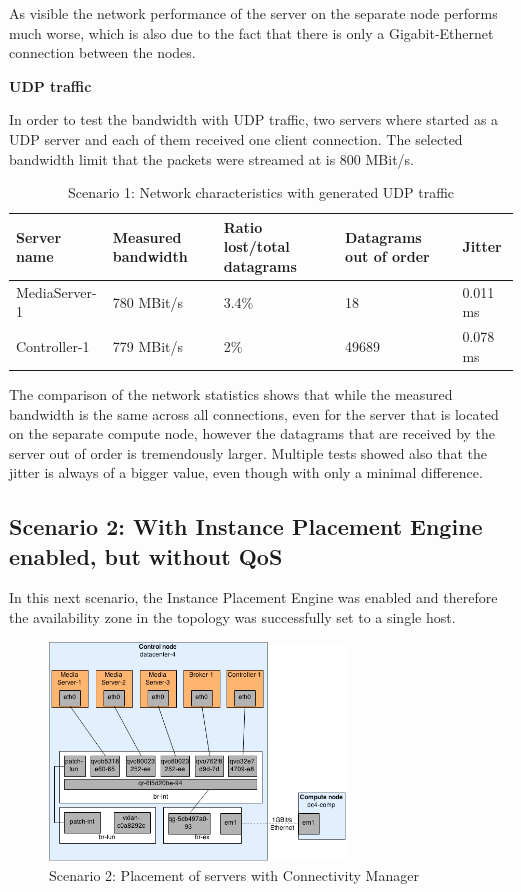 As visible the network performance of the server on the separate node performs much worse, which is also due to the fact that there is only a Gigabit-Ethernet connection between the nodes.

\textbf{UDP traffic}

In order to test the bandwidth with UDP traffic, two servers where started as a UDP server and each of them received one client connection. The selected bandwidth limit that the packets were streamed at is 800 MBit/s.

\begin{table}[H]
\centering

\begin{tabularx}{\textwidth}{ |X|X|X|X|X| }
\hline Server name & Measured bandwidth & Ratio lost/total datagrams & Datagrams out of order & Jitter \\ 
\hline MediaServer-1 & 780 MBit/s & 3.4\% & 18 & 0.011 ms\\ 
\hline Controller-1 & 779 MBit/s & 2\% & 49689 & 0.078 ms \\ 
\hline 
\end{tabularx}

\caption{Scenario 1: Network characteristics with generated UDP traffic}
\end{table}

The comparison of the network statistics shows that while the measured bandwidth is the same across all connections, even for the server that is located on the separate compute node, however the datagrams that are received by the server out of order is tremendously larger. Multiple tests showed also that the jitter is always of a bigger value, even though with only a minimal difference.


\subsection{Scenario 2: With Instance Placement Engine enabled, but without QoS}

In this next scenario, the Instance Placement Engine was enabled and therefore the availability zone in the topology was successfully set to a single host.

\begin{figure}[H]
\centering

\includegraphics[width=0.7\textwidth]{images/evaluation/testbed_scenario2}

\caption{Scenario 2: Placement of servers with Connectivity Manager}
\end{figure}

